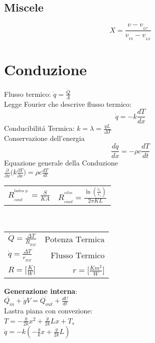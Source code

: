 \documentclass[portrait,a4paper]{article}
\begin{document}
\begin{multicols}{3}
\subsection*{Miscele}
\[ X =\frac{v - v_{_{LC}}}{v_{_{VS}} - v_{_{LS}}}\]


\section*{Conduzione}
Flusso termico: \(\dot{q} = \frac{\dot{Q}}{A} \) \\
Legge Fourier che descrive flusso termico:
\[
\dot{q} = -k\frac{dT}{dx}
\]
Conducibilitá Termica: \( k = \lambda = \frac{\dot{q}L}{\Delta T}\) \\
Conservazione dell'energia
\[
\frac{d\dot{q}}{dx}=-\rho c\frac{dT}{dt}
\]
Equazione generale della Conduzione \\
\(\frac{\partial}{\partial x}\bigg( k\frac{\partial T}{\partial x} \bigg) = \rho c \frac{dT}{dt}
\) \\
\begin{tabular}{c|c}
$ R_{_{cond}}^{^{\text{lastra p.}}} =\frac{S}{KA}$
& $ R_{_{cond}}^{^{cilin}} = \frac {\ln ( \frac {r_{e}}{r_{i}} )} {2 \pi KL} $ \\
\end{tabular} \\

\begin{tabular}{l r}
$\dot{Q} =\frac{\Delta T}{R_{_{TOT}}} $& $\textrm{Potenza Termica}$ \\
$\dot{q} =\frac{\Delta T}{r_{_{TOT}}}$  &$ \textrm{Flusso Termico} $ \\
$ R = \Big[ \frac {K}{W}\Big ]$ & $ r =\Big [\frac{Km^2}{W} \Big] $ \\
\end{tabular}
\textbf{Generazione interna}: \\
\(\dot{Q_{in}} + \dot{g}V = \dot{Q_{out}} + \frac{dU}{dt} \) \\
Lastra piana con convezione: \\
\(T = -\frac{\dot g}{2k}x^2 + \frac{\dot g}{2k}Lx + T_s\) \\
\(\dot q = -k(-\frac{\dot g}{k}x+\frac{\dot g}{2k}L)\) 


\end{multicols}
\end{document}
